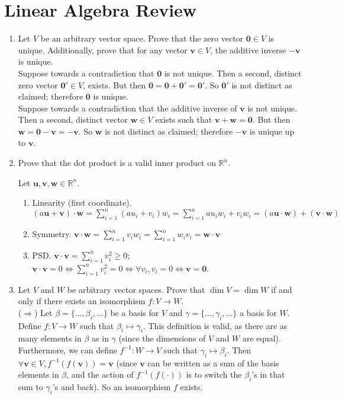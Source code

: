 \documentclass{article}
\begin{document}
\section{Linear Algebra Review}
\begin{enumerate}[label=\arabic*.]
\item Let $V$ be an arbitrary vector space. Prove that the zero vector $\mathbf{0} \in V$ is unique. Additionally, prove that for any vector $\mathbf{v} \in V$, the additive inverse $-\mathbf{v}$ is unique. \\
{\color{blue} Suppose towards a contradiction that $\mathbf{0}$ is not unique. Then a second, distinct zero vector $\mathbf{0'} \in V$, exists. But then $\mathbf{0} = \mathbf{0} + \mathbf{0'} = \mathbf{0'}$. So $\mathbf{0'}$ is not distinct as claimed; therefore $\mathbf{0}$ is unique. \\
Suppose towards a contradiction that the additive inverse of $\mathbf{v}$ is not unique. Then a second, distinct vector $\mathbf{w} \in V$ exists such that $\mathbf{v + w = 0}$. But then $\mathbf{w = 0 - v = -v}$. So $\mathbf{w}$ is not distinct as claimed; therefore $\mathbf{-v}$ is unique up to $\mathbf{v}$.}
\item Prove that the dot product is a valid inner product on $\mathbb{R}^n$. \\
{\color{blue} Let $\mathbf{u}, \mathbf{v}, \mathbf{w} \in \mathbb{R}^n$.
	\begin{enumerate}
	\item Linearity (first coordinate). $(a\mathbf{u} + \mathbf{v}) \cdot \mathbf{w} = \sum\limits_{i=1}^n (au_i + v_i)w_i = \sum\limits_{i = 1}^n au_iw_i + v_iw_i = (a\mathbf{u} \cdot \mathbf{w}) + (\mathbf{v} \cdot \mathbf{w})$
	\item Symmetry. $\mathbf{v} \cdot \mathbf{w} = \sum\limits_{i=1}^n v_iw_i = \sum\limits_{i = 1}^n w_iv_i =\mathbf{w} \cdot \mathbf{v}$
	\item PSD. $\mathbf{v} \cdot \mathbf{v} = \sum\limits_{i = 1}^n v_i^2 \geq 0$; $\mathbf{v} \cdot \mathbf{v} = 0 \iff \sum\limits_{i = 1}^n v_i^2 = 0 \iff \forall v_i, v_i = 0 \iff \mathbf{v = 0}$.
	\end{enumerate} }
\item Let $V$ and $W$ be arbitrary vector spaces. Prove that $\dim V = \dim W$ if and only if there exists an isomorphism $f: V \rightarrow W$. \\
{\color{blue} ($\Rightarrow$) Let $\beta = \{\hdots, \beta_i, \hdots\}$ be a basis for $V$ and $\gamma = \{\hdots, \gamma_i, \hdots\}$ a basis for $W$. Define $f: V \rightarrow W$ such that $\beta_i \mapsto \gamma_i$. This definition is valid, as there are as many elements in $\beta$ as in $\gamma$ (since the dimensions of $V$ and $W$ are equal). Furthermore, we can define $f^{-1}: W \rightarrow V$ such that $\gamma_i \mapsto \beta_i$. Then $\forall \mathbf{v} \in V, f^{-1}(f(\mathbf{v})) = \mathbf{v}$ (since $\mathbf{v}$ can be written as a sum of the basis elements in $\beta$, and the action of $f^{-1}(f(\cdot))$ is to switch the $\beta_i$'s in that sum to $\gamma_i$'s and back). So an isomorphism $f$ exists. \\
}
\end{enumerate}
\end{document}
